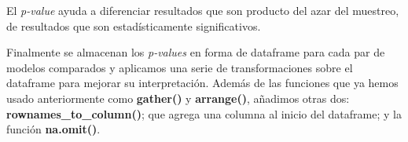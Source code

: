 \documentclass[]{article}
\newenvironment{Shaded}{\begin{snugshade}}{\end{snugshade}}
\newcommand{\DataTypeTok}[1]{\textcolor[rgb]{0.13,0.29,0.53}{#1}}
\newcommand{\KeywordTok}[1]{\textcolor[rgb]{0.13,0.29,0.53}{\textbf{#1}}}
\newcommand{\NormalTok}[1]{#1}
\newcommand{\OperatorTok}[1]{\textcolor[rgb]{0.81,0.36,0.00}{\textbf{#1}}}
\newcommand{\OtherTok}[1]{\textcolor[rgb]{0.56,0.35,0.01}{#1}}
\newcommand{\StringTok}[1]{\textcolor[rgb]{0.31,0.60,0.02}{#1}}
\begin{document}
\begin{Shaded}
\end{Shaded}

\begin{tcolorbox}
	El \emph{p-value} ayuda a diferenciar resultados que son producto del azar del muestreo, de resultados que son estadísticamente significativos. 
\end{tcolorbox}

Finalmente se almacenan los \emph{p-values} en forma de dataframe para cada par de modelos comparados y aplicamos una serie de transformaciones sobre el dataframe para mejorar su interpretación. Además de las funciones que ya hemos usado anteriormente como \textbf{gather()} y \textbf{arrange()}, añadimos otras dos: \textbf{rownames\_to\_column()}; que agrega una columna al inicio del dataframe; y la función \textbf{na.omit()}. 

\begin{Shaded}
\end{Shaded}
\end{document}
